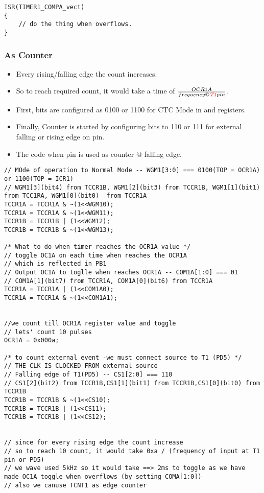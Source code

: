 \begin{verbatim}
ISR(TIMER1_COMPA_vect)
{
    // do the thing when overflows.
}
\end{verbatim}


\subsubsection{As Counter}
\begin{itemize}
    \item Every rising/falling edge the count increases.
    \item So to reach required count, it would take a time of $\frac{OCR1A}{frequency @ \emph{\textcolor{red}{T1}} pin}$.
    \item First,  bits are configured as 0100 or 1100 for CTC Mode in  and  registers.
    \item Finally, Counter is started by configuring  bits to 110 or 111 for external falling or rising edge on  pin.
    \item The code when  pin is used as counter @ falling edge.
\end{itemize}

\begin{verbatim}
// MOde of operation to Normal Mode -- WGM1[3:0] === 0100(TOP = OCR1A) or 1100(TOP = ICR1)
// WGM1[3](bit4) from TCCR1B, WGM1[2](bit3) from TCCR1B, WGM1[1](bit1)  from TCC1RA, WGM1[0](bit0)  from TCCR1A	
TCCR1A = TCCR1A & ~(1<<WGM10);
TCCR1A = TCCR1A & ~(1<<WGM11);
TCCR1B = TCCR1B | (1<<WGM12);
TCCR1B = TCCR1B & ~(1<<WGM13);

/* What to do when timer reaches the OCR1A value */
// toggle OC1A on each time when reaches the OCR1A
// which is reflected in PB1
// Output OC1A to toglle when reaches OCR1A -- COM1A[1:0] === 01
// COM1A[1](bit7) from TCCR1A, COM1A[0](bit6) from TCCR1A
TCCR1A = TCCR1A | (1<<COM1A0);
TCCR1A = TCCR1A & ~(1<<COM1A1);


//we count till OCR1A register value and toggle
// lets' count 10 pulses
OCR1A = 0x000a;

/* to count external event -we must connect source to T1 (PD5) */
// THE CLK IS CLOCKED FROM external source
// Falling edge of T1(PD5) -- CS1[2:0] === 110
// CS1[2](bit2) from TCCR1B,CS1[1](bit1) from TCCR1B,CS1[0](bit0) from TCCR1B
TCCR1B = TCCR1B & ~(1<<CS10);
TCCR1B = TCCR1B | (1<<CS11);
TCCR1B = TCCR1B | (1<<CS12);


// since for every rising edge the count increase
// so to reach 10 count, it would take 0xa / (frequency of input at T1 pin or PD5)
// we wave used 5kHz so it would take ==> 2ms to toggle as we have made OC1A toggle when overflows (by setting COMA[1:0])
// also we canuse TCNT1 as edge counter
\end{verbatim}

